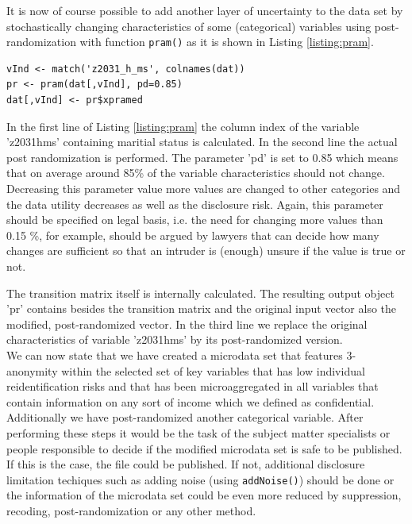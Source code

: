\documentclass[12pt]{article}
\begin{document}
It is now of course possible to add another layer of uncertainty to the data set by stochastically changing 
characteristics of some (categorical) variables using post-randomization with 
function \lstinline{pram()} as it is shown in Listing \ref{listing:pram}.
\begin{lstlisting}[captionpos=b, caption={Post randomization for a categorical variable}, label=listing:pram]
vInd <- match('z2031_h_ms', colnames(dat))
pr <- pram(dat[,vInd], pd=0.85)
dat[,vInd] <- pr$xpramed
\end{lstlisting}
In the first line of Listing \ref{listing:pram} the column index of the variable 
'z2031\textunderscore h\textunderscore ms' containing maritial status is calculated. 
In the second line the actual post randomization is performed. 
The parameter 'pd' is set to 0.85 which means that on average around 85\% of the variable 
characteristics should not change. Decreasing this parameter value more values are changed  to
other categories and the data utility decreases as well as the disclosure risk. Again, this parameter should be specified
on legal basis, i.e. the need for changing more values than 0.15 \%, for example, should be 
argued by lawyers that can decide how many 
changes are sufficient so that an intruder is (enough) unsure if the value is true or not.


The transition matrix itself is internally calculated. 
The resulting output object 'pr' contains besides the transition 
matrix and the original input vector also the modified, post-randomized vector. 
In the third line we replace the original characteristics of variable 
'z2031\textunderscore h\textunderscore ms' by its post-randomized version. \\

We can now state that we have created a microdata set that features 
3-anonymity within the selected set of key variables that has low individual 
reidentification risks and that has been microaggregated in all variables that 
contain information on any sort of income which we defined as confidential. 
Additionally we have post-randomized another categorical variable. 
After performing these steps it would be the task of the subject matter 
specialists or people responsible to decide if the modified microdata set is safe 
to be published. If this is the case, the file could be published. 
If not, additional disclosure limitation techiques such as adding noise 
(using \lstinline{addNoise()}) should be done or the information of the 
microdata set could be even more reduced by suppression, recoding, 
post-randomization or any other method. 
\end{document}
